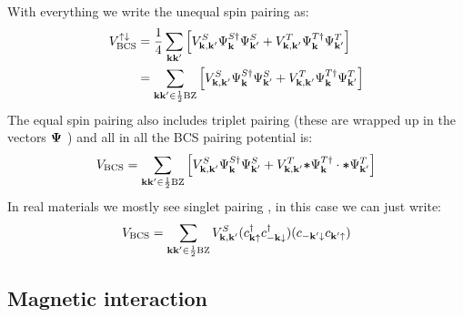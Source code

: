 \documentclass[../main.tex]{subfiles}
\begin{document}
With everything we write the unequal spin pairing as:
\begin{align}
    V_{\text{BCS}}^{\uparrow \downarrow} &= \frac{1}{4} \sum_{\bm{\mathrm{k}} \bm{\mathrm{k}}^{\prime}} \left[ V_{\bm{\mathrm{k}}, \bm{\mathrm{k}}^{\prime}}^S \Psi_{\bm{\mathrm{k}}}^{S \dagger} \Psi_{\bm{\mathrm{k}}^{\prime}}^{S} + V_{\bm{\mathrm{k}}, \bm{\mathrm{k}}^{\prime}}^T \Psi_{\bm{\mathrm{k}}}^{T \dagger} \Psi_{\bm{\mathrm{k}}^{\prime}}^{T} \right] \\
    &= \sum_{\bm{\mathrm{k}} \bm{\mathrm{k}}^{\prime} \in \frac{1}{2} \text{BZ}} \left[ V_{\bm{\mathrm{k}}, \bm{\mathrm{k}}^{\prime}}^S \Psi_{\bm{\mathrm{k}}}^{S \dagger} \Psi_{\bm{\mathrm{k}}^{\prime}}^{S} + V_{\bm{\mathrm{k}}, \bm{\mathrm{k}}^{\prime}}^T \Psi_{\bm{\mathrm{k}}}^{T \dagger} \Psi_{\bm{\mathrm{k}}^{\prime}}^{T} \right]
\end{align}
The equal spin pairing also includes triplet pairing (these are wrapped up in the vectors \(\bm{\mathrm{\Psi}}\) ) and all in all the BCS pairing potential is:
\begin{align}
    V_{\text{BCS}} = \sum_{\bm{\mathrm{k}} \bm{\mathrm{k}}^{\prime} \in \frac{1}{2} \text{BZ}} \left[ V_{\bm{\mathrm{k}}, \bm{\mathrm{k}}^{\prime}}^S \Psi_{\bm{\mathrm{k}}}^{S \dagger} \Psi_{\bm{\mathrm{k}}^{\prime}}^{S} + V_{\bm{\mathrm{k}}, \bm{\mathrm{k}}^{\prime}}^T \bm{\mathrm{*}}{\Psi}_{\bm{\mathrm{k}}}^{T \dagger} \cdot \bm{\mathrm{*}}{\Psi}_{\bm{\mathrm{k}}^{\prime}}^{T} \right]
\end{align}
In real materials we mostly see singlet pairing  , in this case we can just write:
\begin{equation}
    V_{\text{BCS}} = \sum_{\bm{\mathrm{k}} \bm{\mathrm{k}}^{\prime} \in \frac{1}{2} \text{BZ}} V_{\bm{\mathrm{k}}, \bm{\mathrm{k}}^{\prime}}^S
    (c_{\bm{\mathrm{k}} \uparrow}^{\dagger}
    c_{-\bm{\mathrm{k}} \downarrow}^{\dagger})
    (c_{-\bm{\mathrm{k}}^{\prime} \downarrow}
    c_{\bm{\mathrm{k}}^{\prime} \uparrow})
\end{equation}


\subsection{Magnetic interaction}
\end{document}
